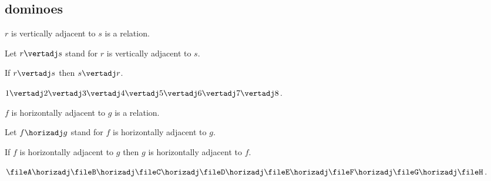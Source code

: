 \subsection{dominoes}

\begin{forthel}
    \begin{signature}
        $r$ is vertically adjacent to $s$ is a relation.
    \end{signature}
    Let $r\vertadj s$ stand for $r$ is vertically adjacent to $s$.

    \begin{axiom}
        If $r\vertadj s$ then $s\vertadj r$.
    \end{axiom}
    \begin{axiom}
        $1\vertadj 2\vertadj 3\vertadj 4\vertadj 5\vertadj 6\vertadj 7\vertadj 8$.
    \end{axiom}


    \begin{signature}
        $f$ is horizontally adjacent to $g$ is a relation.
    \end{signature}
    Let $f\horizadj g$ stand for $f$ is horizontally adjacent to $g$.

    \begin{axiom}
        If $f$ is horizontally adjacent to $g$ then $g$ is horizontally adjacent to $f$.
    \end{axiom}
    \begin{axiom}
        $\fileA \horizadj \fileB \horizadj \fileC \horizadj \fileD
        \horizadj \fileE \horizadj \fileF \horizadj \fileG \horizadj \fileH$.
    \end{axiom}


\end{forthel}
